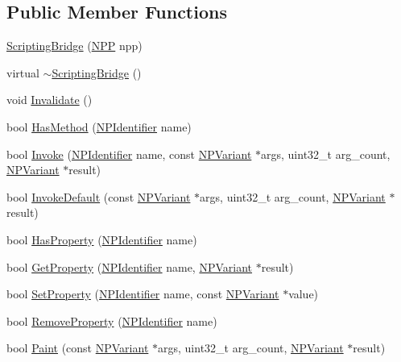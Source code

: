 \subsection*{Public Member Functions}
\begin{DoxyCompactItemize}
\item 
\hyperlink{classcrml_1_1_scripting_bridge_acffa45f2fbbf75e2899dad0715694965}{ScriptingBridge} (\hyperlink{struct___n_p_p}{NPP} npp)
\item 
virtual \hyperlink{classcrml_1_1_scripting_bridge_a2762a9e0d5c5c4c4e43b7740a88b4964}{$\sim$ScriptingBridge} ()
\item 
void \hyperlink{classcrml_1_1_scripting_bridge_ad03efd11014ce3a9aeb0909d9d315f86}{Invalidate} ()
\item 
bool \hyperlink{classcrml_1_1_scripting_bridge_aa8546ab90cbe399399733a53495ec9b3}{HasMethod} (\hyperlink{npruntime_8h_a3ce51391e08bd3e24128c342b1d055b9}{NPIdentifier} name)
\item 
bool \hyperlink{classcrml_1_1_scripting_bridge_ac76ef418e8199808e99a562f678d670c}{Invoke} (\hyperlink{npruntime_8h_a3ce51391e08bd3e24128c342b1d055b9}{NPIdentifier} name, const \hyperlink{struct___n_p_variant}{NPVariant} $\ast$args, uint32\_\-t arg\_\-count, \hyperlink{struct___n_p_variant}{NPVariant} $\ast$result)
\item 
bool \hyperlink{classcrml_1_1_scripting_bridge_a3e96aad4ad401ace8b78213f68faf29b}{InvokeDefault} (const \hyperlink{struct___n_p_variant}{NPVariant} $\ast$args, uint32\_\-t arg\_\-count, \hyperlink{struct___n_p_variant}{NPVariant} $\ast$result)
\item 
bool \hyperlink{classcrml_1_1_scripting_bridge_a349e22860ef3ce03412e1914cccc12ba}{HasProperty} (\hyperlink{npruntime_8h_a3ce51391e08bd3e24128c342b1d055b9}{NPIdentifier} name)
\item 
bool \hyperlink{classcrml_1_1_scripting_bridge_a9e52acfa32559fa8dfa41cf2898a1ba6}{GetProperty} (\hyperlink{npruntime_8h_a3ce51391e08bd3e24128c342b1d055b9}{NPIdentifier} name, \hyperlink{struct___n_p_variant}{NPVariant} $\ast$result)
\item 
bool \hyperlink{classcrml_1_1_scripting_bridge_acbdfa02a2c2e6c6358fbaa825b725230}{SetProperty} (\hyperlink{npruntime_8h_a3ce51391e08bd3e24128c342b1d055b9}{NPIdentifier} name, const \hyperlink{struct___n_p_variant}{NPVariant} $\ast$value)
\item 
bool \hyperlink{classcrml_1_1_scripting_bridge_a406ed77fb660dc3879a71e3ebb59b0a4}{RemoveProperty} (\hyperlink{npruntime_8h_a3ce51391e08bd3e24128c342b1d055b9}{NPIdentifier} name)
\item 
bool \hyperlink{classcrml_1_1_scripting_bridge_a0de2960917327478a47eee5d7f780107}{Paint} (const \hyperlink{struct___n_p_variant}{NPVariant} $\ast$args, uint32\_\-t arg\_\-count, \hyperlink{struct___n_p_variant}{NPVariant} $\ast$result)
\end{DoxyCompactItemize}
